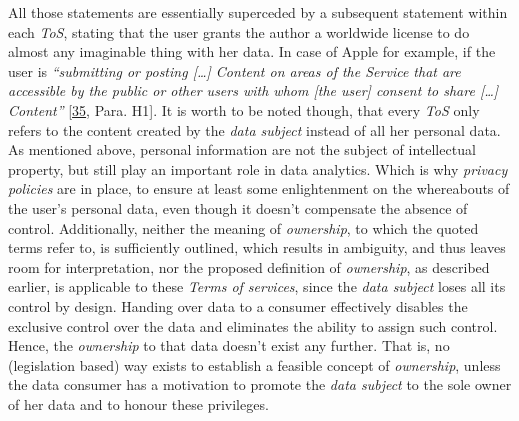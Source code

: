 \documentclass[12pt,english,a4paper,titlepage,cleardoublepage=empty,dottedtoc]{report}
\begin{document}
All those statements are essentially superceded by a subsequent
statement within each \emph{ToS}, stating that the user grants the
author a worldwide license to do almost any imaginable thing with her
data. In case of Apple for example, if the user is \emph{``submitting or
posting {[}\ldots{}{]} Content on areas of the Service that are
accessible by the public or other users with whom {[}the user{]} consent
to share {[}\ldots{}{]} Content''}
{[}\protect\hyperlink{ref-web_2016_apple-icloud_terms-of-service}{35},
Para. H1{]}. It is worth to be noted though, that every \emph{ToS} only
refers to the content created by the \emph{data subject} instead of all
her personal data. As mentioned above, personal information are not the
subject of intellectual property, but still play an important role in
data analytics. Which is why \emph{privacy policies} are in place, to
ensure at least some enlightenment on the whereabouts of the user's
personal data, even though it doesn't compensate the absence of control.
Additionally, neither the meaning of \emph{ownership}, to which the
quoted terms refer to, is sufficiently outlined, which results in
ambiguity, and thus leaves room for interpretation, nor the proposed
definition of \emph{ownership},
\protect\hypertarget{def--ownership}{}{as described earlier}, is
applicable to these \emph{Terms of services}, since the \emph{data
subject} loses all its control by design. Handing over data to a
consumer effectively disables the exclusive control over the data and
eliminates the ability to assign such control. Hence, the
\emph{ownership} to that data doesn't exist any further. That is, no
(legislation based) way exists to establish a feasible concept of
\emph{ownership}, unless the data consumer has a motivation to promote
the \emph{data subject} to the sole owner of her data and to honour
these privileges.
\end{document}
